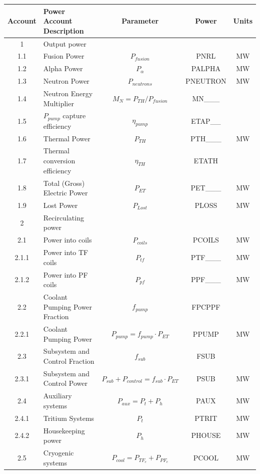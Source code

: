 \begin{table}[ht!]								
\centering								
\begin{tabular}{|c|p{5cm}|c|c|c|}								
\hline								
\textbf{Account}	&	\textbf{Power Account Description}	&	\textbf{Parameter }	&	\textbf{Power}	&	\textbf{Units} \\
\hline								
1	&	Output power	&		&		&	\\
\hline
1.1	&	Fusion Power	&	$P_{{fusion}}$	&	PNRL	&	MW \\
1.2	&	Alpha Power	&	$P_{{\alpha}}$	&	PALPHA	&	MW \\
1.3	&	Neutron Power	&	$P_{{neutrons}}$	&	PNEUTRON	&	MW \\
1.4	&	Neutron Energy Multiplier	&	$M_N = P_{{TH}}/P_{{fusion}}$	&	MN___	&	\\
1.5	&	$P_{pump}$ capture efficiency	&	$\eta_{{pump}}$	&	ETAP__	&	\\
1.6	&	Thermal Power	&	$P_{{TH}}$	&	PTH___	&	MW \\
1.7	&	Thermal conversion efficiency	&	$\eta_{{TH}}$	&	ETATH	&	\\
1.8	&	Total (Gross) Electric Power	&	$P_{{ET}}$	&	PET___	&	MW \\
1.9	&	Lost Power	&	$P_{{Lost}}$	&	PLOSS	&	MW \\
\hline								
2	&	Recirculating power	&		&		&	\\
\hline
2.1	&	Power into coils 	&	$P_{coils}$ &	PCOILS	&	MW \\
2.1.1	&	Power into TF coils	&	$P_{tf}$	&	PTF___	&	MW \\
2.1.2	&	Power into PF coils	&	$P_{pf}$	&	PPF___		&	MW \\
2.2	&	Coolant Pumping Power Fraction	&	$f_{{pump}}$	&	FPCPPF &	\\
2.2.1	&	Coolant Pumping Power	&	$P_{{pump}} = f_{{pump}} \cdot P_{{ET}}$	&	PPUMP	&	MW \\
2.3	&	Subsystem and Control Fraction	&	$f_{{sub}}$	&	FSUB	&	\\
2.3.1	&	Subsystem and Control Power	&	$P_{{sub}} + P_{{control}} = f_{{sub}} \cdot P_{{ET}}$	&	PSUB	&	MW \\
2.4	&	Auxiliary systems	&	$P_{{aux}} = P_{{t}} + P_{{h}}$	&	PAUX	&	MW \\
2.4.1	&	Tritium Systems	&	$P_{{t}}$	&	PTRIT	&	MW \\
2.4.2	&	Housekeeping power	&	$P_{{h}}$	&	PHOUSE	&	MW \\
2.5	&	Cryogenic systems	&	$P_{{cool}} = P_{{TF}_c} + P_{{PF}_c}$	&	PCOOL	&	MW \\

\end{tabular}
\end{table}
